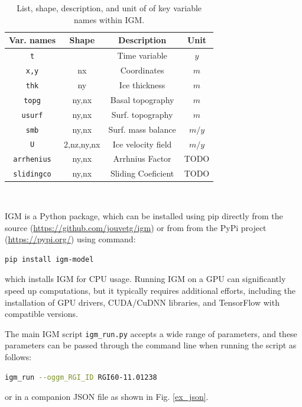 \documentclass[10pt,twocolumn]{article}
\begin{document}
\begin{table}
\begin{tabular}{|c|c|c|c|}
\hline 
Var. names &     Shape        & Description                       & Unit    \\
\hline
\texttt{t}              &                &  Time variable                    & $y$       \\
\texttt{x,y}            & nx             &  Coordinates                      & $m$       \\
\texttt{thk}            & ny             &  Ice thickness                    & $m$      \\
\texttt{topg}           & ny,nx          &  Basal topography                 & $m$       \\
\texttt{usurf}          & ny,nx          &  Surf. topography                 & $m$       \\
\texttt{smb}            & ny,nx          &  Surf. mass balance               & $m/y$ \\ %
\texttt{U}              & 2,nz,ny,nx     &  Ice velocity field               & $m/y$     \\
\texttt{arrhenius}      & ny,nx          &  Arrhnius Factor                  & TODO \\ %
\texttt{slidingco}      & ny,nx          &  Sliding Coeficient               & TODO \\
\hline 
\end{tabular} 
$ $ \\
\caption{List, shape, description, and unit of  of key variable names within IGM.  \label{variable_name}}
\end{table}

IGM is a Python package, which can be installed using pip directly from the source 
(\url{https://github.com/jouvetg/igm}) or from from the PyPi project (\url{https://pypi.org/})
using command:
\begin{lstlisting}[language=bash,frame=single,numbers=none]
pip install igm-model
\end{lstlisting}  
which installs IGM for CPU usage. Running IGM on a GPU can significantly speed up computations, 
but it typically requires additional efforts, including the installation of GPU drivers, 
CUDA/CuDNN libraries, and TensorFlow with compatible versions. 

The main IGM script \texttt{igm\_run.py} accepts a wide range of parameters, 
and these parameters can be passed through the command line when running the script
as follows:
\begin{lstlisting}[language=bash,frame=single,numbers=none]
igm_run --oggm_RGI_ID RGI60-11.01238
\end{lstlisting} 
or in a companion JSON file as shown in Fig. \ref{ex_json}.
\end{document}

